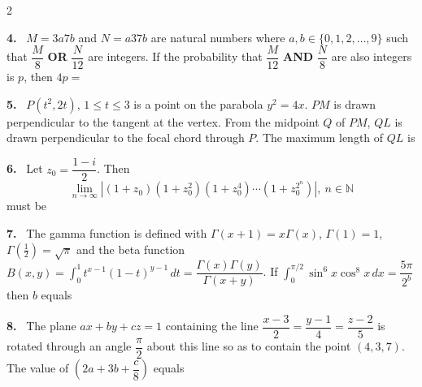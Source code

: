 \documentclass[10pt]{extarticle}
\newcommand{\qn}[1]{\par\smallskip\noindent\textbf{#1.}~}
\begin{document}
\begin{multicols}{2}
\qn{4} $M=3a7b$ and $N=a37b$ are natural numbers where $a,b\in\{0,1,2,\dots,9\}$ such that $\dfrac M8$ \textbf{OR} $\dfrac N{12}$ are integers. If the probability that $\dfrac M{12}$ \textbf{AND} $\dfrac N8$ are also integers is $p$, then $4p=$
\qn{5} $P(t^2,2t)$, $1\le t\le3$ is a point on the parabola $y^2=4x$. $PM$ is drawn perpendicular to the tangent at the vertex. From the midpoint $Q$ of $PM$, $QL$ is drawn perpendicular to the focal chord through $P$. The maximum length of $QL$ is
\qn{6} Let $z_0=\dfrac{1-i}{2}$. Then \[\lim_{n\to\infty}\left|(1+z_0)\left(1+z_0^2\right)\left(1+z_0^4\right)\cdots\left(1+z_0^{2^n}\right)\right|,\ n\in\mathbb N\] must be
\qn{7} The gamma function is defined with $\Gamma(x+1)=x\Gamma(x)$, $\Gamma(1)=1$, $\Gamma\!\left(\tfrac12\right)=\sqrt\pi$ and the beta function $B(x,y)=\displaystyle\int_0^1t^{x-1}(1-t)^{y-1}\,dt=\dfrac{\Gamma(x)\Gamma(y)}{\Gamma(x+y)}$. If $\displaystyle\int_0^{\pi/2}\sin^6x\cos^8x\,dx=\dfrac{5\pi}{2^b}$ then $b$ equals
\qn{8} The plane $ax+by+cz=1$ containing the line $\dfrac{x-3}{2}=\dfrac{y-1}{4}=\dfrac{z-2}{5}$ is rotated through an angle $\dfrac\pi2$ about this line so as to contain the point $(4,3,7)$. The value of $\left(2a+3b+\dfrac c8\right)$ equals
\end{multicols}
\end{document}
